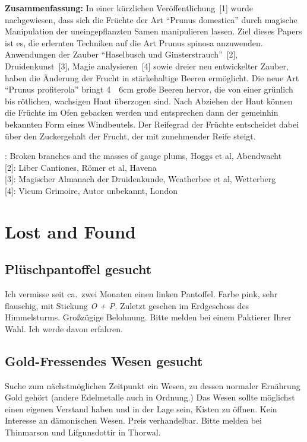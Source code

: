 \documentclass[final]{multiversum}
\begin{document}
\textbf{Zusammenfassung:} In einer kürzlichen Veröffentlichung~[1] wurde
nachgewiesen, dass sich die Früchte der Art \enquote{Prunus domestica} durch
magische Manipulation der uneingepflanzten Samen manipulieren lassen.  Ziel
dieses Papers ist es, die erlernten Techniken auf die Art Prunus spinosa
anzuwenden.  Anwendungen der Zauber \enquote{Haselbusch und Ginsterstrauch}~[2],
Druidenkunst~[3], Magie analysieren~[4] sowie dreier neu entwickelter Zauber,
haben die Änderung der Frucht in stärkehaltige Beeren ermöglicht.  Die neue Art
\enquote{Prunus profiterola} bringt 4~\textendash~6cm große Beeren hervor, die
von einer grünlich bis rötlichen, wachsigen Haut überzogen sind.  Nach Abziehen
der Haut können die Früchte im Ofen gebacken werden und entsprechen dann der
gemeinhin bekannten Form eines Windbeutels.  Der Reifegrad der Früchte
entscheidet dabei über den Zuckergehalt der Frucht, der mit zunehmender Reife
steigt. 


\noindent[1]: Broken branches and the masses of gauge plums,
Hoggs et al, Abendwacht\\{}
[2]: Liber Cantiones, Römer et al, Havena\\{}
[3]: Magischer Almanach der Druidenkunde, Weatherbee et al, Wetterberg\\{}
[4]: Vicum Grimoire, Autor unbekannt, London



\section{Lost and Found}
\subsection{Plüschpantoffel gesucht}
Ich vermisse seit ca.\ zwei Monaten einen linken Pantoffel.  Farbe pink, sehr
flauschig, mit Stickung \emph{O + P}.  Zuletzt gesehen im Erdgeschoss des
Himmelsturms.  Großzügige Belohnung.  Bitte melden bei einem Paktierer Ihrer Wahl.
Ich werde davon erfahren.

\subsection{Gold-Fressendes Wesen gesucht}
Suche zum nächstmöglichen Zeitpunkt ein Wesen, zu dessen normaler Ernährung Gold
gehört (andere Edelmetalle auch in Ordnung.) Das Wesen sollte möglichst einen
eigenen Verstand haben und in der Lage sein, Kisten zu öffnen.  Kein Interesse
an dämonischen Wesen.  Preis verhandelbar.  Bitte melden bei Thinmarson und
Lifgunsdottir in Thorwal.
\end{document}
